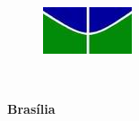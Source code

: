\begin{titlepage}
\begin{center}

\begin{figure}[h!]
	\centering
		\includegraphics[scale = 0.8]{ac/logos/unb.png}
	\label{fig:unb}
\end{figure}

{\bf \unb \\
\bf \dep }
\vspace{5cm}

\setcounter{page}{0}
\null
\textbf{\titulo}
\vspace{2.5cm}

\vspace{0.2cm}
\textbf{\autor}
\end{center}
\vspace{1.5cm}

\vspace{5cm}
\begin{center}
{\bf{Brasília} \\ }
\bf{\ano}
\end{center}

\end{titlepage}
